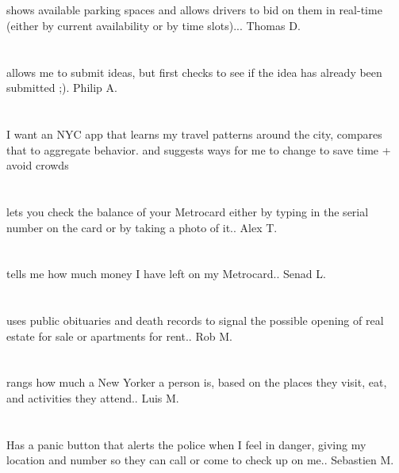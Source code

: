 \section{}shows available parking spaces and allows drivers to bid on them in real-time (either by current availability or by time slots)... Thomas D.
\section{}allows me to submit ideas,  but first checks to see if the idea has already been submitted ;). Philip A.
\section{}  I want an NYC app that learns my travel patterns around the city,  compares that to aggregate behavior.  and suggests ways for me to change to save time + avoid crowds
\section{}lets you check the balance of your Metrocard either by typing in the serial number on the card or by taking a photo of it.. Alex T.
\section{}tells me how much money I have left on my Metrocard.. Senad L.
\section{}uses public obituaries and death records to signal the possible opening of real estate for sale or apartments for rent.. Rob M.
\section{} rangs how much a New Yorker a person is,  based on the places they visit,  eat,  and activities they attend.. Luis M.
\section{}Has a panic button that alerts the police when I feel in danger,  giving my location and number so they can call or come to check up on me.. Sebastien M.
